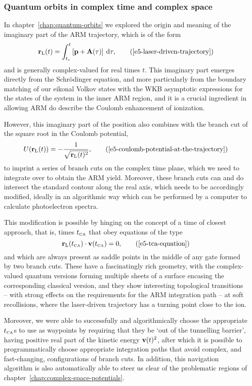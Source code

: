 \subsubsection{Quantum orbits in complex time and complex space}
In chapter~\ref{chap:quantum-orbits} we explored the origin and meaning of the imaginary part of the ARM trajectory, which is of the form
\begin{equation}
\rl(t) = \int_{\ts}^{t} \left[\vbp+\vba(\tau) \right] \: \d\tau
,
\backtag{e5-laser-driven-trajectory}
\end{equation}
and is generally complex-valued for real times $t$. This imaginary part emerges directly from the Schrödinger equation, and more particularly from the boundary matching of our eikonal Volkov states with the WKB asymptotic expressions for the states of the system in the inner ARM region, and it is a crucial ingredient in allowing ARM do describe the Coulomb enhancement of ionization.

However, this imaginary part of the position also combines with the branch cut of the square root in the Coulomb potential,
\begin{equation}
U(\rl(t)) = -\frac{1}{\sqrt{\rl(t)^2}},
\backtag{e5-coulomb-potential-at-the-trajectory}
\end{equation}
to imprint a series of branch cuts on the complex time plane, which we need to integrate over to obtain the ARM yield. Moreover, these branch cuts can and do intersect the standard contour along the real axis, which needs to be accordingly modified, ideally in an algorithmic way which can be performed by a computer to calculate photoelectron spectra.

This modification is possible by hinging on the concept of a time of closest approach, that is, times ${t_{\scriptscriptstyle\mathrm{CA}}}$ that obey equations of the type
\begin{equation}
\rl(\tca)\cdot\vbv(\tca)=0,
\backtag{e5-tca-equation}
\end{equation}
and which are always present as saddle points in the middle of any gate formed by two branch cuts. These have a fascinatingly rich geometry, with the complex-valued quantum versions forming multiple sheets of a surface encasing the corresponding classical version, and they show interesting topological transitions -- with strong effects on the requirements for the ARM integration path -- at soft recollisions, where the laser-driven trajectory has a turning point close to the ion.

Moreover, we were able to successfully and algorithmically choose the appropriate ${t_{\scriptscriptstyle\mathrm{CA}}}$s to use as waypoints by requiring that they be `out of the tunnelling barrier', having positive real part of the kinetic energy $\vb{v}(t)^2$, after which it is possible to programmatically choose appropriate integration paths that avoid complex, and fast-changing, configurations of branch cuts. In addition, this navigation algorithm is also automatically able to steer us clear of the problematic regions of chapter~\ref{chap:complex-space-potentials}.





